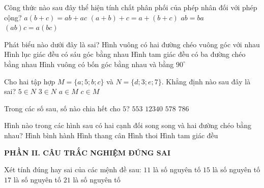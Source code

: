 \documentclass[12pt,a4paper]{article}
\begin{document}
\begin{ex}
Công thức nào sau đây thể hiện tính chất phân phối của phép nhân đối với phép cộng?
\choice
{\True $a(b + c) = ab + ac$}
{$(a + b) + c = a + (b + c)$}
{$ab = ba$}
{$(ab)c = a(bc)$}
\end{ex}

\begin{ex}
Phát biểu nào dưới đây là sai?
\choice
{Hình vuông có hai đường chéo vuông góc với nhau}
{Hình lục giác đều có sáu góc bằng nhau}
{\True Hình tam giác đều có ba đường chéo bằng nhau}
{Hình vuông có bốn góc bằng nhau và bằng $90^\circ$}
\end{ex}

\begin{ex}
Cho hai tập hợp $M = \{a; 5; b; c\}$ và $N = \{d; 3; e; 7\}$. Khẳng định nào sau đây là sai?
\choice
{\True $5 \in N$}
{$3 \in N$}
{$a \in M$}
{$c \in M$}
\end{ex}

\begin{ex}
Trong các số sau, số nào chia hết cho $5$?
\choice
{$553$}
{\True $12340$}
{$578$}
{$786$}
\end{ex}

\begin{ex}
Hình nào trong các hình sau có hai cạnh đối song song và hai đường chéo bằng nhau?
\choice
{Hình bình hành}
{\True Hình thang cân}
{Hình thoi}
{Hình tam giác đều}
\end{ex}


\setcounter{ex}{0}
\noindent\textbf{\large PHẦN II. CÂU TRẮC NGHIỆM ĐÚNG SAI}
\vspace{1mm}
\begin{ex}
Xét tính đúng hay sai của các mệnh đề sau:
\choiceTF
{\True $11$ là số nguyên tố}
{$15$ là số nguyên tố}
{\True $17$ là số nguyên tố}
{$21$ là số nguyên tố}
\end{ex}
\end{document}
